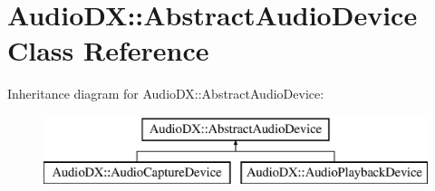 \hypertarget{class_audio_d_x_1_1_abstract_audio_device}{\section{Audio\-D\-X\-:\-:Abstract\-Audio\-Device Class Reference}
\label{class_audio_d_x_1_1_abstract_audio_device}
}
Inheritance diagram for Audio\-D\-X\-:\-:Abstract\-Audio\-Device\-:\begin{figure}[H]
\begin{center}
\leavevmode
\includegraphics[height=2.000000cm]{class_audio_d_x_1_1_abstract_audio_device}
\end{center}
\end{figure}
